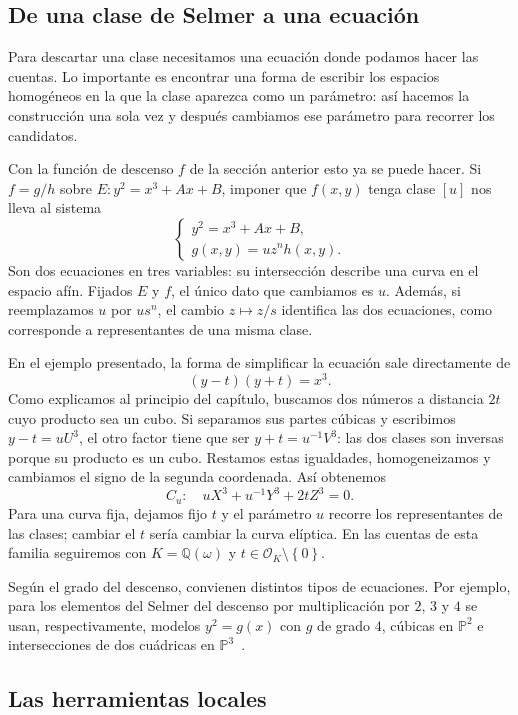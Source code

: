 \documentclass[a4paper]{book}
\theoremstyle{definition}
\theoremstyle{plain}
\newcommand{\QQ}{\mathbb{Q}}
\newcommand{\PP}{\mathbb{P}}
\newcommand{\OO}{\mathcal{O}}
\newcommand{\lla}{\left\lbrace}
\newcommand{\rla}{\right\rbrace}
\begin{document}
\subsection{De una clase de Selmer a una ecuación}

Para descartar una clase necesitamos una ecuación donde podamos hacer las cuentas. Lo importante es encontrar una forma de escribir los espacios homogéneos en la que la clase aparezca como un parámetro: así hacemos la construcción una sola vez y después cambiamos ese parámetro para recorrer los candidatos.

Con la función de descenso $f$ de la sección anterior esto ya se puede hacer. Si $f=g/h$ sobre $E:y^2=x^3+Ax+B$, imponer que $f(x,y)$ tenga clase $[u]$ nos lleva al sistema
\[
\begin{cases}
y^2=x^3+Ax+B,\\
g(x,y)=uz^n h(x,y).
\end{cases}
\]
Son dos ecuaciones en tres variables: su intersección describe una curva en el espacio afín. Fijados $E$ y $f$, el único dato que cambiamos es $u$. Además, si reemplazamos $u$ por $us^n$, el cambio $z\mapsto z/s$ identifica las dos ecuaciones, como corresponde a representantes de una misma clase.

En el ejemplo presentado, la forma de simplificar la ecuación sale directamente de
\[
(y-t)(y+t)=x^3.
\]
Como explicamos al principio del capítulo, buscamos dos números a distancia $2t$ cuyo producto sea un cubo. Si separamos sus partes cúbicas y escribimos $y-t=uU^3$, el otro factor tiene que ser $y+t=u^{-1}V^3$: las dos clases son inversas porque su producto es un cubo. Restamos estas igualdades, homogeneizamos y cambiamos el signo de la segunda coordenada. Así obtenemos
\begin{equation*}
C_u:\quad uX^3+u^{-1}Y^3+2tZ^3=0.
\end{equation*}
Para una curva fija, dejamos fijo $t$ y el parámetro $u$ recorre los representantes de las clases; cambiar el $t$ sería cambiar la curva elíptica. En las cuentas de esta familia seguiremos con $K=\QQ(\omega)$ y $t\in\OO_K\setminus\lla0\rla$. 

Según el grado del descenso, convienen distintos tipos de ecuaciones. Por ejemplo, para los elementos del Selmer del descenso por multiplicación por $2$, $3$ y $4$ se usan, respectivamente, modelos $y^2=g(x)$ con $g$ de grado $4$, cúbicas en $\PP^2$ e intersecciones de dos cuádricas en $\PP^3$~\cite{Stoll2006Descent}.

\subsection{Las herramientas locales}
\end{document}
